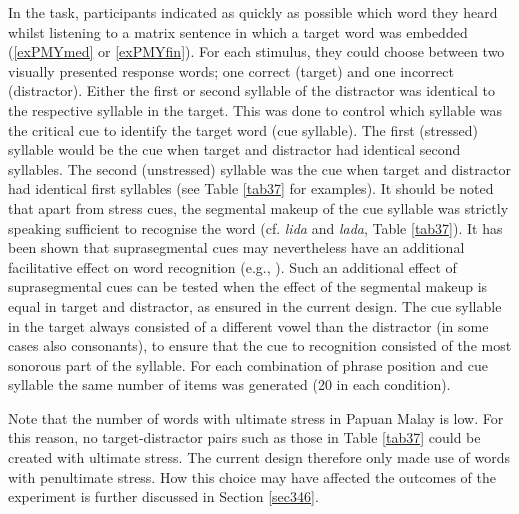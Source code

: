In the task, participants indicated as quickly as possible which word they heard whilst listening to a matrix sentence in which a target word was embedded (\ref{exPMYmed} or \ref{exPMYfin}). For each stimulus, they could choose between two visually presented response words; one correct (target) and one incorrect (distractor). Either the first or second syllable of the distractor was identical to the respective syllable in the target. This was done to control which syllable was the critical cue to identify the target word (cue syllable). The first (stressed) syllable would be the cue when target and distractor had identical second syllables. The second (unstressed) syllable was the cue when target and distractor had identical first syllables (see Table \ref{tab37} for examples). It should be noted that apart from stress cues, the segmental makeup of the cue syllable was strictly speaking sufficient to recognise the word (cf. \textit{lida} and \textit{lada}, Table \ref{tab37}). It has been shown that suprasegmental cues may nevertheless have an additional facilitative effect on word recognition (e.g., \citealt{cutler_lexical_2005}). Such an additional effect of suprasegmental cues can be tested when the effect of the segmental makeup is equal in target and distractor, as ensured in the current design. The cue syllable in the target always consisted of a different vowel than the distractor (in some cases also consonants), to ensure that the cue to recognition consisted of the most sonorous part of the syllable. For each combination of phrase position and cue syllable the same number of items was generated (20 in each condition).

Note that the number of words with ultimate stress in Papuan Malay is low. For this reason, no target-distractor pairs such as those in Table \ref{tab37} could be created with ultimate stress. The current design therefore only made use of words with penultimate stress. How this choice may have affected the outcomes of the experiment is further discussed in Section \ref{sec346}.

